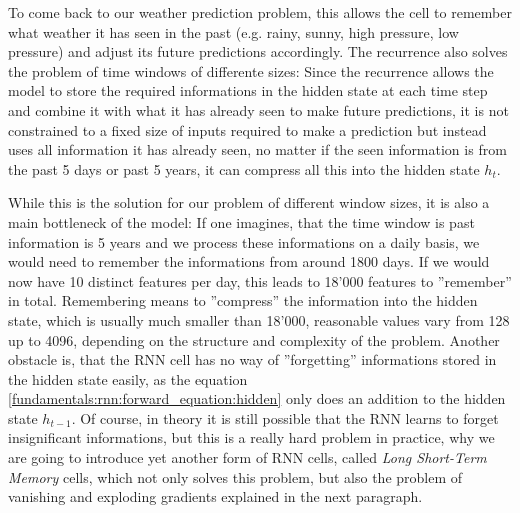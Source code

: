 To come back to our weather prediction problem, this allows the cell to remember what weather it has seen in the past (e.g. rainy, sunny, high pressure, low pressure) and adjust its future predictions accordingly. The recurrence also solves the problem of time windows of differente sizes: Since the recurrence allows the model to store the required informations in the hidden state at each time step and combine it with what it has already seen to make future predictions, it is not constrained to a fixed size of inputs required to make a prediction but instead uses all information it has already seen, no matter if the seen information is from the past 5 days or past 5 years, it can compress all this into the hidden state $h_t$.

While this is the solution for our problem of different window sizes, it is also a main bottleneck of the model: If one imagines, that the time window is past information is 5 years and we process these informations on a daily basis, we would need to remember the informations from around 1800 days. If we would now have 10 distinct features per day, this leads to 18'000 features to ''remember'' in total. Remembering means to ''compress'' the information into the hidden state, which is usually much smaller than 18'000, reasonable values vary from 128 up to 4096, depending on the structure and complexity of the problem. Another obstacle is, that the RNN cell has no way of ''forgetting'' informations stored in the hidden state easily, as the equation \ref{fundamentals:rnn:forward_equation:hidden} only does an addition to the hidden state $h_{t-1}$. Of course, in theory it is still possible that the RNN learns to forget insignificant informations, but this is a really hard problem in practice, why we are going to introduce yet another form of RNN cells, called \emph{Long Short-Term Memory} cells, which not only solves this problem, but also the problem of vanishing and exploding gradients explained in the next paragraph.

